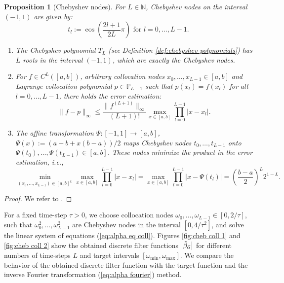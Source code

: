 \documentclass[a4paper,11pt,bibliography=totoc,listof=totoc,headinclude=true,cleardoublepage=empty,oneside]{scrbook}
\newtheorem{prop}[theorem]{Proposition}
\newcommand{\N}{\mathbb{N}}
\newcommand{\dffv}{\Tilde{\beta}_{\Vec{\alpha}}}
\renewcommand{\eqref}[1]{(\ref{#1})}
\begin{document}
\begin{prop}[Chebyshev nodes] \label{def:chebyshev nodes}
    For $L\in\N$, Chebyshev nodes on the interval $(-1, 1)$ are given by:
    \begin{equation*}
        t_l := \cos\left(\frac{2l+1}{2L}\pi\right) \text{ for } l = 0, \dots, L-1.
    \end{equation*}
    \begin{enumerate}
        \item The Chebyshev polynomial $T_L$ (see Definition \ref{def:chebyshev polynomials}) has $L$ roots in the interval $(-1, 1)$, which are exactly the Chebyshev nodes.
        \item For $f \in C^{L}\left([a,b]\right)$, arbitrary collocation nodes $x_0, \dots, x_{L-1} \in [a,b]$ and Lagrange collocation polynomial $p\in \mathbb{P}_{L-1}$ such that $p(x_l) = f(x_l)$ for all $l=0, \dots, L-1$, there holds the error estimation:
        \begin{equation}\label{eq:lagrange error est}
            \|f-p\|_\infty \leqslant \frac{\|f^{(L+1)}\|_\infty}{(L+1)!} \max_{x\in[a,b]} \prod_{l=0}^{L-1} \left|x-x_l\right|.
        \end{equation}
        \item The affine transformation $\Psi: [-1, 1] \rightarrow [a,b]$, $\Psi(x) := \left(a+b+x(b-a)\right)/2$ maps Chebyshev nodes $t_0, \dots, t_{L-1}$ onto $\Psi(t_0), \dots, \Psi(t_{L-1}) \in [a,b]$. These nodes minimize the product in the error estimation, i.e.,
        \begin{equation*}
            \min_{(x_0, \dots, x_{L-1})\in [a,b]^L}  \max_{x\in[a,b]} \prod_{l=0}^{L-1} \left|x-x_l\right| =  \max_{x\in[a,b]} \prod_{l=0}^{L-1} \left|x-\Psi(t_l)\right| = \left(\frac{b-a}{2}\right)^{L} 2^{1-L}.
        \end{equation*}
    \end{enumerate}
\end{prop}
\begin{proof}
    We refer to \cite[p. 23--24]{numericsAB}.
\end{proof}

For a fixed time-step $\tau>0$, we choose collocation nodes $\omega_0, \dots, \omega_{L-1} \in \left[0, 2/\tau\right]$, such that $\omega_0^2, \dots, \omega_{L-1}^2$ are Chebyshev nodes in the interval $\left[0, 4/\tau^2\right]$, and solve the linear system of equations \eqref{eq:alpha eq coll}. Figures \ref{fig:cheb coll 1} and \ref{fig:cheb coll 2} show the obtained discrete filter functions $\left|\dffv\right|$ for different numbers of time-steps $L$ and target intervals $\left[\omega_{\min}, \omega_{\max} \right]$. We compare the behavior of the obtained discrete filter function with the target function and the inverse Fourier transformation \eqref{eq:alpha fourier} method.
\end{document}
